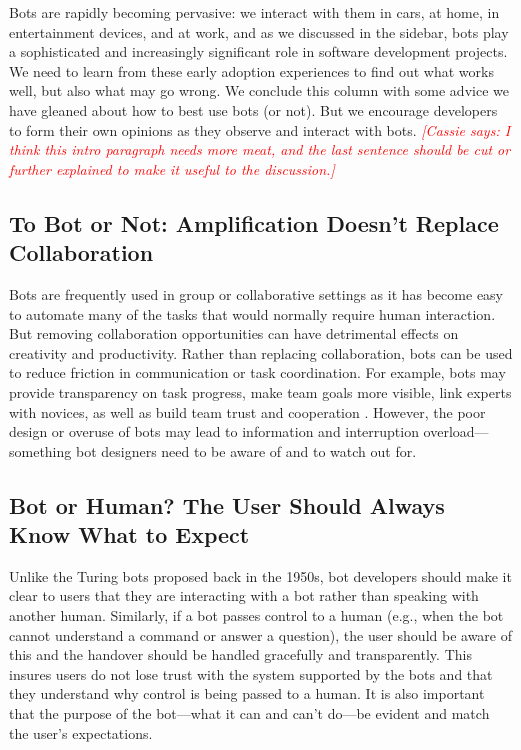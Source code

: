 \documentclass{sig-alternate}
\newcommand{\cp}[1]{\textcolor{red}{{\it [Cassie says: #1]}}}
\begin{document}
	Bots are rapidly becoming pervasive: we interact with them in cars, at home, in entertainment devices, and at work, and as we discussed in the sidebar, bots play a sophisticated and increasingly significant role in software development projects.  
	We need to learn from these early adoption experiences to find out what works well, but also what may go wrong.  We conclude this column with some advice we have gleaned about how to best use bots (or not).   
	But we encourage developers to form their own opinions as they observe and interact with bots. 
	\cp{I think this intro paragraph needs more meat, and the last sentence should be cut or further explained to make it useful to the discussion.} 
	
	
	\subsection{To Bot or Not: Amplification Doesn't Replace Collaboration}
		Bots are frequently used in group or collaborative settings as 
		it has become easy to automate many of the tasks that would normally require human interaction. But removing collaboration opportunities can have detrimental effects on creativity and productivity. 
		Rather than replacing collaboration, bots can be used to reduce friction in communication or task coordination. For example, bots may provide transparency on task progress, make team goals more visible, link experts with novices, as well as build team trust and cooperation \cite{lebeuf2017software}.
		However, the poor design or overuse of bots may lead to information and interruption overload---something bot designers need to be aware of and to watch out for.  

	\subsection{Bot or Human? The User Should Always Know What to Expect}

	Unlike the Turing bots proposed back in the 1950s, bot developers should make it clear to users that they are interacting with a bot rather than speaking with another human. 
	Similarly, if a bot passes control to a human (e.g., when the bot cannot understand a command or answer a question), the user should be aware of this and the handover should be handled gracefully and transparently. This insures users do not lose trust with the system supported by the bots and that they understand why control is being passed to a human. 
	It is also important that the purpose of the bot---what it can and can't do---be evident and match the user's expectations. 
\end{document}
